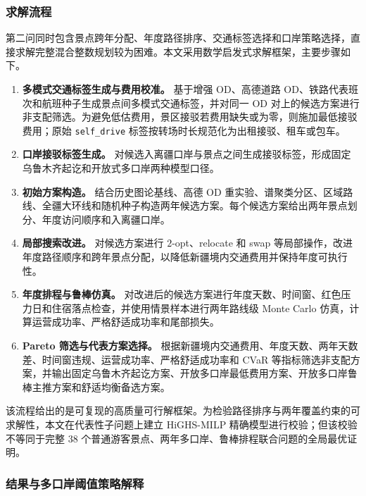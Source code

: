 \documentclass[UTF8,zihao=-4,a4paper]{ctexart}
\begin{document}
\subsubsection{求解流程}
\label{subsubsec:q2_solution_process}

第二问同时包含景点跨年分配、年度路径排序、交通标签选择和口岸策略选择，直接求解完整混合整数规划较为困难。本文采用数学启发式求解框架，主要步骤如下。

\begin{enumerate}
    \item \textbf{多模式交通标签生成与费用校准。}
    基于增强 OD、高德道路 OD、铁路代表班次和航班种子生成景点间多模式交通标签，并对同一 OD 对上的候选方案进行非支配筛选。为避免低估费用，景区接驳若费用缺失或为零，则施加最低接驳费用；原始 \texttt{self\_drive} 标签按转场时长规范化为出租接驳、租车或包车。

    \item \textbf{口岸接驳标签生成。}
    对候选入离疆口岸与景点之间生成接驳标签，形成固定乌鲁木齐起讫和开放式多口岸两种模型口径。

    \item \textbf{初始方案构造。}
    结合历史图论基线、高德 OD 重实验、谱聚类分区、区域路线、全疆大环线和随机种子构造两年候选方案。每个候选方案给出两年景点划分、年度访问顺序和入离疆口岸。

    \item \textbf{局部搜索改进。}
    对候选方案进行 $2$-opt、relocate 和 swap 等局部操作，改进年度路径顺序和跨年景点分配，以降低新疆境内交通费用并保持年度可执行性。

    \item \textbf{年度排程与鲁棒仿真。}
    对改进后的候选方案进行年度天数、时间窗、红色压力日和住宿落点检查，并使用情景样本进行两年路线级 Monte Carlo 仿真，计算运营成功率、严格舒适成功率和尾部损失。

    \item \textbf{Pareto 筛选与代表方案选择。}
    根据新疆境内交通费用、年度天数、两年天数差、时间窗违规、运营成功率、严格舒适成功率和 CVaR 等指标筛选非支配方案，并输出固定乌鲁木齐起讫方案、开放多口岸最低费用方案、开放多口岸鲁棒主推方案和舒适均衡备选方案。
\end{enumerate}

该流程给出的是可复现的高质量可行解框架。为检验路径排序与两年覆盖约束的可求解性，本文在代表性子问题上建立 HiGHS-MILP 精确模型进行校验；但该校验不等同于完整 $38$ 个普通游客景点、两年多口岸、鲁棒排程联合问题的全局最优证明。

\subsubsection{结果与多口岸阈值策略解释}
\label{subsubsec:q2_results_gateway}
\end{document}

